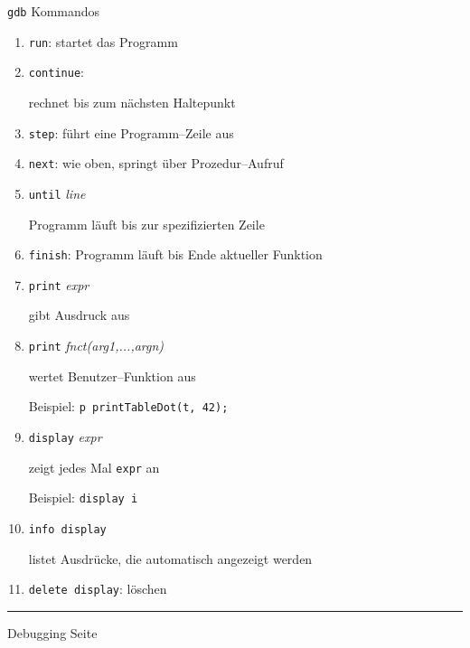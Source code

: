 \begin{slide}{}
\normalsize

\begin{center}
\texttt{gdb} Kommandos
\end{center}
\vspace*{0.5cm}

\footnotesize
\begin{enumerate}
\item \texttt{run}:  startet das Programm
\item \texttt{continue}: 

      rechnet bis zum n\"achsten Haltepunkt
\item \texttt{step}:
      f\"uhrt eine Programm--Zeile aus
\item \texttt{next}:
      wie oben, springt \"uber Prozedur--Aufruf
\item \texttt{until} \textsl{line}

      Programm l\"auft bis zur spezifizierten Zeile
\item \texttt{finish}: 
      Programm l\"auft bis Ende aktueller Funktion
\item \texttt{print} \textsl{expr}

       gibt Ausdruck aus
\item \texttt{print} \textsl{fnct(arg1,...,argn)}

          wertet Benutzer--Funktion aus
    
       Beispiel: \texttt{p printTableDot(t, 42);}

\item \texttt{display} \textsl{expr}

      zeigt jedes Mal \texttt{expr} an

      Beispiel: \texttt{display i}

\item \texttt{info display} 

      listet Ausdr\"ucke, die automatisch angezeigt werden
\item \texttt{delete display}: l\"oschen
\end{enumerate}

\vspace*{\fill}
\tiny \addtocounter{mypage}{1}
\rule{17cm}{1mm}
Debugging  \hspace*{\fill} Seite 
\end{slide}


